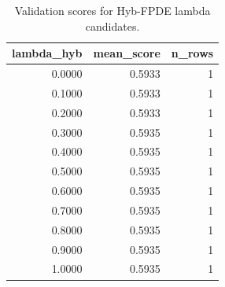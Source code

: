 \begin{table}[t]
\caption{Validation scores for Hyb-FPDE lambda candidates.}
\label{tab:lambda_distribution_computed}
\centering
\begin{tabular}{rrr}
\toprule
lambda\_hyb & mean\_score & n\_rows \\
\midrule
0.0000 & 0.5933 & 1 \\
0.1000 & 0.5933 & 1 \\
0.2000 & 0.5933 & 1 \\
0.3000 & 0.5935 & 1 \\
0.4000 & 0.5935 & 1 \\
0.5000 & 0.5935 & 1 \\
0.6000 & 0.5935 & 1 \\
0.7000 & 0.5935 & 1 \\
0.8000 & 0.5935 & 1 \\
0.9000 & 0.5935 & 1 \\
1.0000 & 0.5935 & 1 \\
\bottomrule
\end{tabular}

\end{table}

